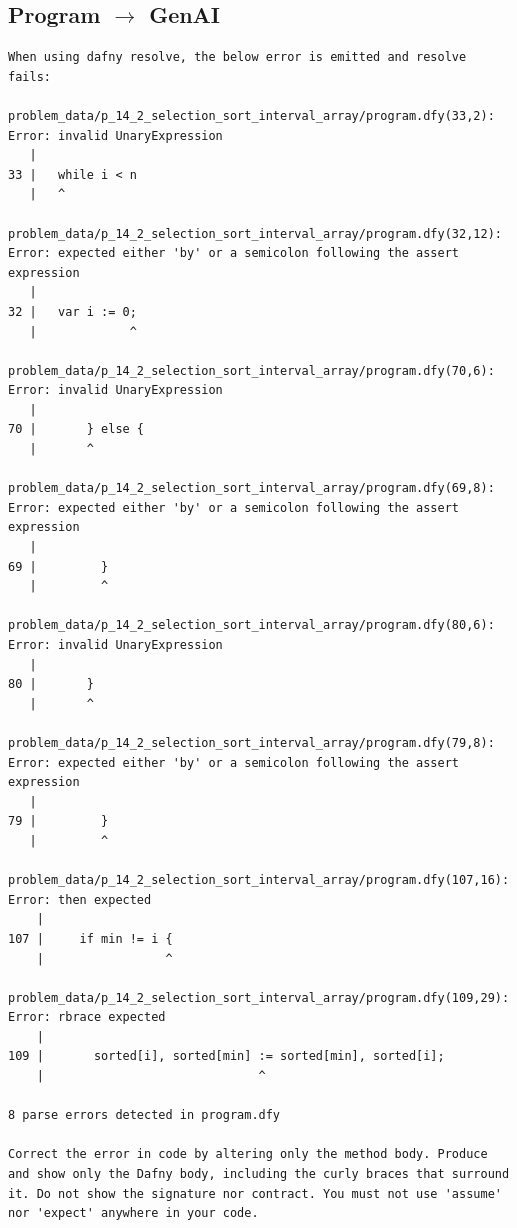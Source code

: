 \documentclass{article}
\begin{document}
\subsection*{Program $\rightarrow$ GenAI}
\begin{lstlisting}
When using dafny resolve, the below error is emitted and resolve fails:

problem_data/p_14_2_selection_sort_interval_array/program.dfy(33,2): Error: invalid UnaryExpression
   |
33 |   while i < n
   |   ^

problem_data/p_14_2_selection_sort_interval_array/program.dfy(32,12): Error: expected either 'by' or a semicolon following the assert expression
   |
32 |   var i := 0;
   |             ^

problem_data/p_14_2_selection_sort_interval_array/program.dfy(70,6): Error: invalid UnaryExpression
   |
70 |       } else {
   |       ^

problem_data/p_14_2_selection_sort_interval_array/program.dfy(69,8): Error: expected either 'by' or a semicolon following the assert expression
   |
69 |         }
   |         ^

problem_data/p_14_2_selection_sort_interval_array/program.dfy(80,6): Error: invalid UnaryExpression
   |
80 |       }
   |       ^

problem_data/p_14_2_selection_sort_interval_array/program.dfy(79,8): Error: expected either 'by' or a semicolon following the assert expression
   |
79 |         }
   |         ^

problem_data/p_14_2_selection_sort_interval_array/program.dfy(107,16): Error: then expected
    |
107 |     if min != i {
    |                 ^

problem_data/p_14_2_selection_sort_interval_array/program.dfy(109,29): Error: rbrace expected
    |
109 |       sorted[i], sorted[min] := sorted[min], sorted[i];
    |                              ^

8 parse errors detected in program.dfy

Correct the error in code by altering only the method body. Produce and show only the Dafny body, including the curly braces that surround it. Do not show the signature nor contract. You must not use 'assume' nor 'expect' anywhere in your code.
\end{lstlisting}
\end{document}
